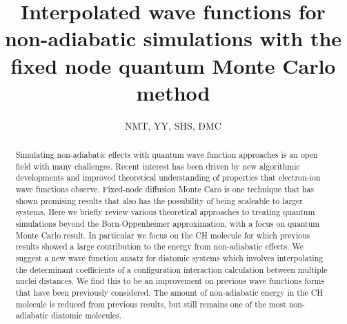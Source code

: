 \documentclass[aip,jcp,numerical,reprint]{revtex4-1}
\begin{document}
\title{Interpolated wave functions for non-adiabatic simulations with the fixed node quantum Monte Carlo method}
\author{NMT, YY, SHS, DMC}

\begin{abstract}
Simulating non-adiabatic effects with quantum wave function approaches is an open field with many challenges.  %
 Recent interest has been driven by new algorithmic developments and improved theoretical understanding of properties that electron-ion wave functions observe.  Fixed-node diffusion Monte Caro is one technique that has shown promising results that also has the possibility of being scaleable to larger systems.
 Here we briefly review various theoretical approaches to  treating quantum simulations beyond the Born-Oppenheimer approximation, with a focus on quantum Monte Carlo result.  In particular we focus on the CH molecule for which previous results showed a large contribution to the energy from non-adiabatic effects.  We suggest a new wave function ansatz for diatomic systems which involves interpolating the determinant coefficients of a configuration interaction calculation between multiple nuclei distances.   We find this to be an improvement on previous wave functions forms that have been previously considered.    The amount of non-adiabatic energy in the CH molecule is reduced from previous results, but still remains one of the most non-adiabatic  diatomic molecules. 

\end{abstract}
\maketitle
\end{document}
